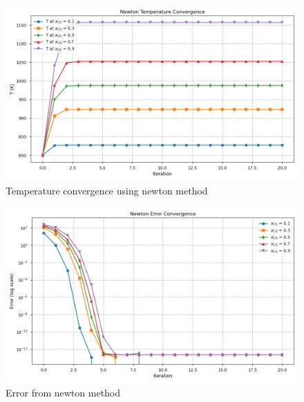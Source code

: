 \documentclass[10pt]{article}
\begin{document}
\begin{figure}[H]
    \centering
    \includegraphics[width=\imagewidth\textwidth]{figures/07_nonlinear/Newton_Temperature_convergence.png}
    \caption{Temperature convergence using newton method}
\end{figure}

\begin{figure}[H]
    \centering
    \includegraphics[width=\imagewidth\textwidth]{figures/07_nonlinear/newton_error_convergence.png}
    \caption{Error from newton method}
\end{figure}
\end{document}
